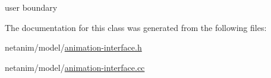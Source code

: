 user boundary 



The documentation for this class was generated from the following files\+:\begin{DoxyCompactItemize}
\item 
netanim/model/\hyperlink{animation-interface_8h}{animation-\/interface.\+h}\item 
netanim/model/\hyperlink{animation-interface_8cc}{animation-\/interface.\+cc}\end{DoxyCompactItemize}
